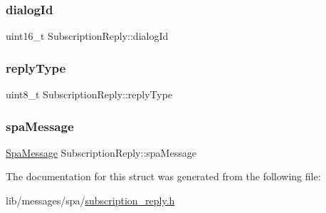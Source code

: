 \subsubsection{\texorpdfstring{dialog\+Id}{dialogId}}
{\footnotesize\ttfamily uint16\+\_\+t Subscription\+Reply\+::dialog\+Id}

\mbox{\label{structSubscriptionReply_a289965f913a0dac7204482b86798ed5a}} 
\subsubsection{\texorpdfstring{reply\+Type}{replyType}}
{\footnotesize\ttfamily uint8\+\_\+t Subscription\+Reply\+::reply\+Type}

\mbox{\label{structSubscriptionReply_a4e4c24f7a85c8c2ac00604e9edf0bbab}} 
\subsubsection{\texorpdfstring{spa\+Message}{spaMessage}}
{\footnotesize\ttfamily \hyperlink{structSpaMessage}{Spa\+Message} Subscription\+Reply\+::spa\+Message}



The documentation for this struct was generated from the following file\+:\begin{DoxyCompactItemize}
\item 
lib/messages/spa/\hyperlink{subscription__reply_8h}{subscription\+\_\+reply.\+h}\end{DoxyCompactItemize}
